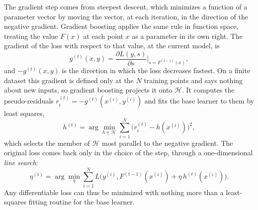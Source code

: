     The gradient step comes from steepest descent, which minimizes a function of
    a parameter vector by moving the vector, at each iteration, in the direction
    of the negative gradient. Gradient boosting applies the same rule in
    function space, treating the value $F(x)$ at each point $x$ as a parameter
    in its own right. The
    gradient of the loss with respect to that value, at the current model, is
    \begin{equation}
    g^{(t)}(x, y) =
    \frac{\partial L(y, s)}{\partial s} \bigg|_{s = F^{(t-1)}(x)},
    \label{eq:bg:gbm:grad}
    \end{equation}
    and $-g^{(t)}(x, y)$ is the direction in which the loss decreases fastest. On a
    finite dataset this gradient is defined only at the $N$ training points and
    says nothing about new inputs, so gradient boosting projects
    it onto $\mathcal{H}$. It computes the pseudo-residuals
    $r_i^{(t)} = -g^{(t)}(x^{(i)}, y^{(i)})$ and fits the base learner to them by
    least squares,
    \begin{equation}
    h^{(t)} = \arg\min_{h \in \mathcal{H}}
    \sum_{i=1}^{N} \bigl( r_i^{(t)} - h(x^{(i)}) \bigr)^{2},
    \label{eq:bg:gbm:lsfit}
    \end{equation}
    which selects the member of $\mathcal{H}$ most parallel to the negative
    gradient. The original loss comes back
    only in the choice of the step, through a one-dimensional \emph{line search}:
    \begin{equation}
    \eta^{(t)} = \arg\min_{\eta}
    \sum_{i=1}^{N} L\bigl( y^{(i)}, F^{(t-1)}(x^{(i)}) + \eta\, h^{(t)}(x^{(i)}) \bigr).
    \label{eq:bg:gbm:linesearch}
    \end{equation}
    Any differentiable loss can thus be minimized with nothing more than a
    least-squares fitting routine for the base learner.

